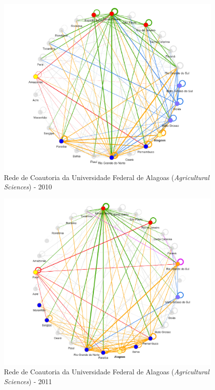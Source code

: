 \begin{figure}[H]
	\centering
	\includegraphics[scale=0.6]{Imagens/rede-agr-AL-2010.pdf}
	\caption{Rede de Coautoria da Universidade Federal de Alagoas (\textit{Agricultural Sciences}) - 2010}
	\label{Rede de Coautoria - UF AGRI AL 2010}
\end{figure}

\begin{figure}[H]
	\centering
	\includegraphics[scale=0.6]{Imagens/rede-agr-AL-2011.pdf}
	\caption{Rede de Coautoria da Universidade Federal de Alagoas (\textit{Agricultural Sciences}) - 2011}
	\label{Rede de Coautoria - UF AGRI AL 2011}
\end{figure}


